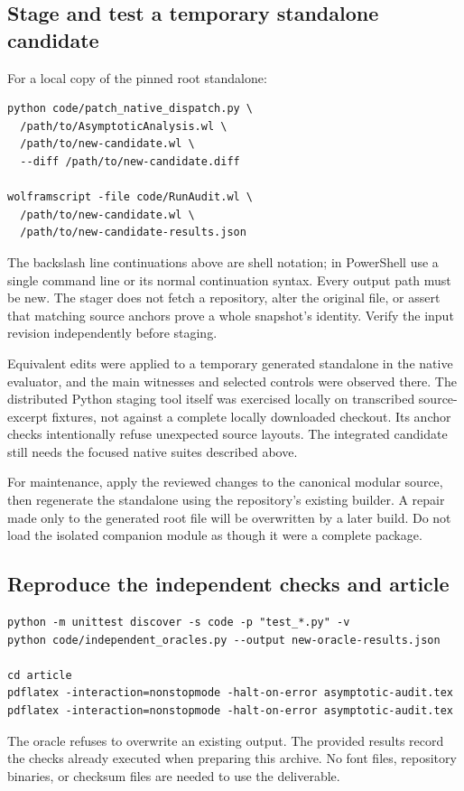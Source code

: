 \documentclass[11pt,letterpaper]{article}
\begin{document}
\subsection{Stage and test a temporary standalone candidate}

For a local copy of the pinned root standalone:
\begin{lstlisting}[language={},basicstyle=\ttfamily\footnotesize]
python code/patch_native_dispatch.py \
  /path/to/AsymptoticAnalysis.wl \
  /path/to/new-candidate.wl \
  --diff /path/to/new-candidate.diff

wolframscript -file code/RunAudit.wl \
  /path/to/new-candidate.wl \
  /path/to/new-candidate-results.json
\end{lstlisting}
The backslash line continuations above are shell notation; in PowerShell use
a single command line or its normal continuation syntax. Every output path
must be new. The stager does not fetch a repository, alter the original file,
or assert that matching source anchors prove a whole snapshot's identity.
Verify the input revision independently before staging.

Equivalent edits were applied to a temporary generated standalone in the
native evaluator, and the main witnesses and selected controls were observed
there. The distributed Python staging tool itself was exercised locally on
transcribed source-excerpt fixtures, not against a complete locally downloaded
checkout. Its anchor checks intentionally refuse unexpected source layouts.
The integrated candidate still needs the focused native suites described
above.

For maintenance, apply the reviewed changes to the canonical modular source,
then regenerate the standalone using the repository's existing builder. A
repair made only to the generated root file will be overwritten by a later
build. Do not load the isolated companion module as though it were a complete
package.

\subsection{Reproduce the independent checks and article}
\begin{lstlisting}[language={}]
python -m unittest discover -s code -p "test_*.py" -v
python code/independent_oracles.py --output new-oracle-results.json

cd article
pdflatex -interaction=nonstopmode -halt-on-error asymptotic-audit.tex
pdflatex -interaction=nonstopmode -halt-on-error asymptotic-audit.tex
\end{lstlisting}
The oracle refuses to overwrite an existing output. The provided results
record the checks already executed when preparing this archive. No font files,
repository binaries, or checksum files are needed to use the deliverable.
\end{document}
